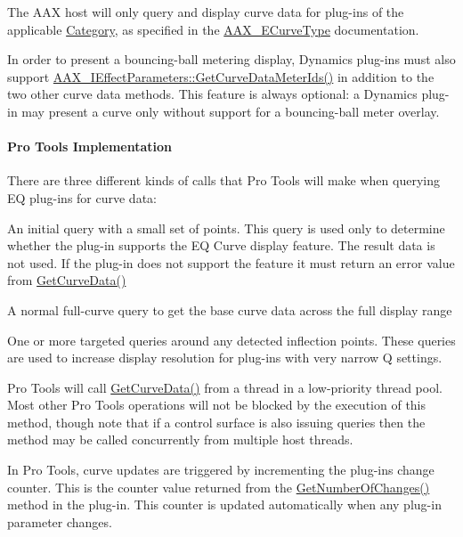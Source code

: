  The A\+AX host will only query and display curve data for plug-\/ins of the applicable \mbox{\hyperlink{a00491_aef9637518fb1ac0e2f403444c73aba4a}{Category}}, as specified in the \mbox{\hyperlink{a00812_ga59c73d8f51c5c55d54a728eff39da884}{A\+A\+X\+\_\+\+E\+Curve\+Type}} documentation.

 In order to present a bouncing-\/ball metering display, Dynamics plug-\/ins must also support \mbox{\hyperlink{a00812_gac7ba3c1063c35d761fdeba9c9a6cc0d1}{A\+A\+X\+\_\+\+I\+Effect\+Parameters\+::\+Get\+Curve\+Data\+Meter\+Ids()}} in addition to the two other curve data methods. This feature is always optional\+: a Dynamics plug-\/in may present a curve only without support for a bouncing-\/ball meter overlay.



\paragraph*{Pro Tools Implementation}

 There are three different kinds of calls that Pro Tools will make when querying EQ plug-\/ins for curve data\+:
\begin{DoxyItemize}
\item An initial query with a small set of points. This query is used only to determine whether the plug-\/in supports the EQ Curve display feature. The result data is not used. If the plug-\/in does not support the feature it must return an error value from \mbox{\hyperlink{a00812_gaa85bda4027342eb644a9c92a17da6d49}{Get\+Curve\+Data()}}
\item A normal full-\/curve query to get the base curve data across the full display range
\item One or more targeted queries around any detected inflection points. These queries are used to increase display resolution for plug-\/ins with very narrow Q settings.
\end{DoxyItemize}

 Pro Tools will call \mbox{\hyperlink{a00812_gaa85bda4027342eb644a9c92a17da6d49}{Get\+Curve\+Data()}} from a thread in a low-\/priority thread pool. Most other Pro Tools operations will not be blocked by the execution of this method, though note that if a control surface is also issuing queries then the method may be called concurrently from multiple host threads.

 In Pro Tools, curve updates are triggered by incrementing the plug-\/in\textquotesingle{}s change counter. This is the counter value returned from the \mbox{\hyperlink{a01669_a17b96da201d9a242d3662e87525a7227}{Get\+Number\+Of\+Changes()}} method in the plug-\/in. This counter is updated automatically when any plug-\/in parameter changes.



